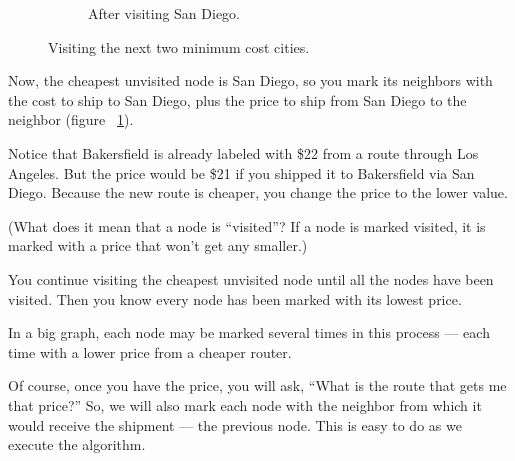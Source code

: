 \begin{figure}[H]
\begin{subfigure}{0.4\textwidth}
        \caption{After visiting San Diego.}
        \label{fig:step2b}
    \end{subfigure}

    \caption{Visiting the next two minimum cost cities.}
    \label{fig:step2}
\end{figure}

Now, the cheapest unvisited node is San Diego, so you mark its
neighbors with the cost to ship to San Diego, plus the price to ship
from San Diego to the neighbor (figure ~\ref{fig:step2b}).

Notice that Bakersfield is already labeled with \$22 from a route
through Los Angeles.  But the price would be \$21 if you shipped it to
Bakersfield via San Diego.  Because the new route is cheaper, you
change the price to the lower value.

(What does it mean that a node is ``visited''?  If a node is marked
visited, it is marked with a price that won't get any smaller.)

You continue visiting the cheapest unvisited node until all the
nodes have been visited.  Then you know every node has been marked
with its lowest price.

In a big graph, each node may be marked several times in this process
--- each time with a lower price from a cheaper router.

Of course, once you have the price, you will ask, ``What is the route
that gets me that price?''  So, we will also mark each node with the
neighbor from which it would receive the shipment --- the previous
node.  This is easy to do as we execute the algorithm.

